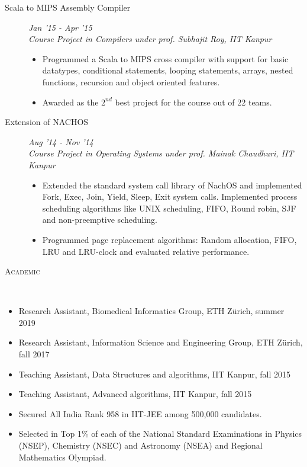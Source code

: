 \documentclass[9pt]{article}
\newenvironment{changemargin}[2]{%
  \begin{list}{}{%
      \setlength{\topsep}{0pt}%
    \setlength{\leftmargin}{#1}%
    \setlength{\rightmargin}{#2}%
    \setlength{\listparindent}{\parindent}%
  \setlength{\itemindent}{\parindent}%
    \setlength{\parsep}{\parskip}%
    }%
  \item[]}{\end{list}
    }
\newcommand{\lineover}{
  \begin{changemargin}{-0.05in}{-0.10in}
    \vspace*{-9pt}
    \hrulefill \\
    \vspace*{-2pt}
  \end{changemargin}
}
\newcommand{\header}[1]{
  \begin{changemargin}{-0.5in}{-0.5in}
    \scshape{#1}\\
        \lineover
  \end{changemargin}
}
\newenvironment{body} {
  \vspace*{-16pt}
        \begin{changemargin}{-0.6in}{-0.65in}
        }	
        {\end{changemargin}
}
\begin{document}
\begin{body}
\begin{description}
  \item[\normalsize{Scala to MIPS Assembly Compiler}] \hfill \textit{Jan '15 - Apr '15} \\
    \textit{Course Project in Compilers under prof. Subhajit Roy, IIT Kanpur}
  \begin{itemize}
    \item Programmed a Scala to MIPS cross compiler with support for basic datatypes, conditional statements, looping statements, arrays, nested functions, recursion and object oriented features.
    \item Awarded as the $2^{nd}$ best project for the course out of 22 teams.
  \end{itemize}

\item[\normalsize{Extension of NACHOS}]  \hfill \textit{Aug '14 - Nov '14} \\
  \textit{Course Project in Operating Systems under prof. Mainak Chaudhuri, IIT Kanpur}
  \begin{itemize}
    \item Extended the standard system call library of NachOS and implemented Fork, Exec, Join, Yield, Sleep, Exit system calls.
      Implemented process scheduling algorithms like UNIX scheduling, FIFO, Round robin, SJF and non-preemptive scheduling.
    \item Programmed page replacement algorithms: Random allocation, FIFO, LRU and LRU-clock and evaluated relative performance.
  \end{itemize}

  \end{description}
  \smallskip
\end{body}

\vspace{2 mm}
\header{Academic}
\begin{body}
  \vspace{14pt}
        \begin{changemargin}{0.15in}{0.15in}
          \begin{itemize}
            \item Research Assistant, Biomedical Informatics Group, ETH Z{\"u}rich, summer 2019
            \item Research Assistant, Information Science and Engineering Group, ETH Z{\"u}rich, fall 2017
            \item Teaching Assistant, Data Structures and algorithms, IIT Kanpur, fall 2015
            \item Teaching Assistant, Advanced algorithms, IIT Kanpur, fall 2015
            \item Secured All India Rank 958 in IIT-JEE among 500,000 candidates.
            \item Selected in Top 1\% of each of the National Standard Examinations 
              in Physics (NSEP), Chemistry (NSEC) and Astronomy (NSEA) and Regional
              Mathematics Olympiad.
          \end{itemize}
        \end{changemargin}
\end{body}
\end{document}
